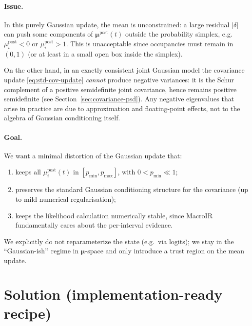 \documentclass[11pt]{article}
\begin{document}
\paragraph{Issue.}
In this purely Gaussian update, the mean is unconstrained: a large
residual \(|\delta|\) can push some components of
\(\boldsymbol{\mu}^{\text{post}}(t)\) outside the probability simplex, e.g.\
\(\mu^{\text{post}}_i < 0\) or \(\mu^{\text{post}}_i > 1\).
This is unacceptable since occupancies must remain in \((0,1)\)
(or at least in a small open box inside the simplex).

On the other hand, in an exactly consistent joint Gaussian model the covariance
update \eqref{eq:std-cov-update} \emph{cannot} produce negative variances: it
is the Schur complement of a positive semidefinite joint covariance, hence
remains positive semidefinite (see Section~\ref{sec:covariance-psd}).
Any negative eigenvalues that arise in practice are due to approximation and
floating-point effects, not to the algebra of Gaussian conditioning itself.

\paragraph{Goal.}
We want a minimal distortion of the Gaussian update that:
\begin{enumerate}
  \item keeps all \(\mu^{\text{post}}_i(t)\) in \([p_{\min},p_{\max}]\),
        with \(0 < p_{\min} \ll 1\);
  \item preserves the standard Gaussian conditioning structure for the
        covariance (up to mild numerical regularisation);
  \item keeps the likelihood calculation numerically stable, since MacroIR
        fundamentally cares about the per-interval evidence.
\end{enumerate}

We explicitly do not reparameterize the state (e.g.\ via logits); we stay in
the “Gaussian-ish’’ regime in \(\boldsymbol{\mu}\)-space and only introduce a
trust region on the mean update.


\section{Solution (implementation-ready recipe)}
\end{document}
